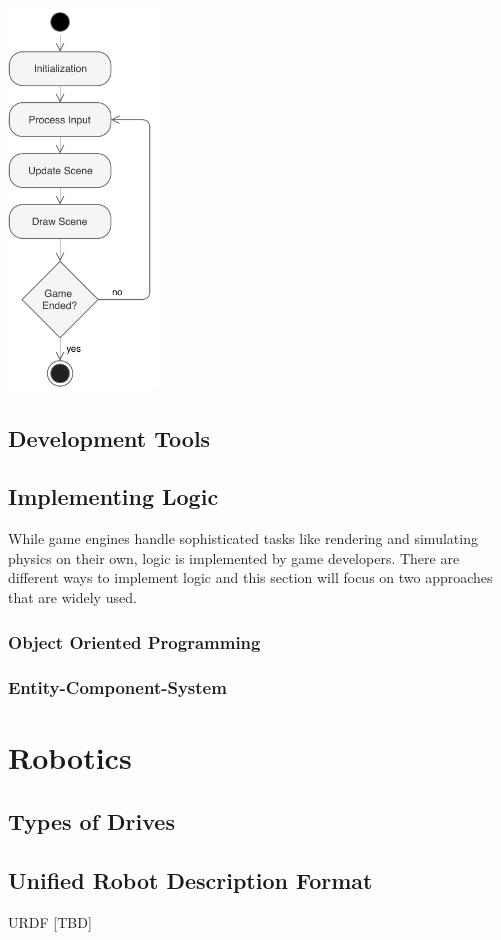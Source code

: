 \begin{center}
\noindent\includegraphics[width=4cm]{tex/img/ch03/GameLoop_04.pdf}
\label{fig:game-loop}
\end{center}

\subsection{Development Tools}


\subsection{Implementing Logic}
While game engines handle sophisticated tasks like rendering and simulating physics on their own, logic is implemented by game developers. There are different ways to implement logic and this section will focus on two approaches that are widely used.

\subsubsection{Object Oriented Programming}


\subsubsection{Entity-Component-System}



\section{Robotics}
\subsection{Types of Drives}
\subsection{Unified Robot Description Format}
\ac{URDF} [TBD]